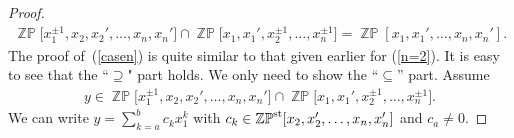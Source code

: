 \documentclass[pdftex]{sigma}
\numberwithin{equation}{section}
\begin{document}
\begin{proof}
\begin{gather}\label{casen}
\mathop{\mathbb{ZP}}\!\big[x^{\pm1}_1,x_{2},x_{2}',\ldots,x_{n},x_{n}'\big] \cap\mathop{\mathbb{ZP}}\!\big[x_{1},x_{1}',x^{\pm1}_2,\ldots,x^{\pm1}_n\big] =\mathop{\mathbb{ZP}}[x_1,x_{1}',\ldots,x_{n},x_{n}'].
\end{gather}
The proof of~(\ref{casen}) is quite similar to that given earlier for (\ref{n=2}). It is easy to see that the ``$\supseteq$" part holds. We only need to show the ``$\subseteq$'' part. Assume{\samepage
\begin{gather*}
y\in \mathop{\mathbb{ZP}}\!\big[x^{\pm1}_1,x_{2},x_{2}',\ldots,x_{n},x_{n}'\big] \cap\mathop{\mathbb{ZP}}\!\big[x_{1},x_{1}',x^{\pm1}_2,\ldots,x^{\pm1}_n\big].
\end{gather*}
We can write $y=\sum\limits_{k=a}^{b}c_kx_{1}^{k}$ with $c_k\in\mathop{\mathbb{ZP}}\nolimits^{\rm st} [x_2,x'_2,\ldots,x_n,x'_n]$ and $c_a\neq0$.}


\end{proof}
\end{document}
